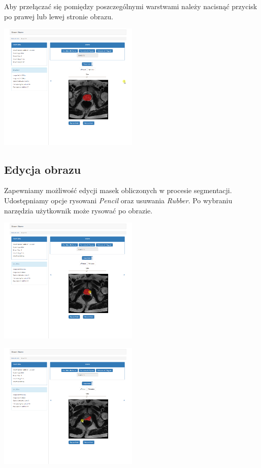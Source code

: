 \documentclass[a4paper,11pt,twoside]{report}
\theoremstyle{definition}
\begin{document}
Aby przełączać się pomiędzy poszczególnymi warstwami należy nacisnąć przycisk po prawej lub lewej stronie obrazu.

\begin{minipage}{\linewidth}
	\centering
	\includegraphics[width=0.5\textwidth]{FrontScreen/Editing/15.png}
\end{minipage}

\subsection{Edycja obrazu}

Zapewniamy możliwość edycji masek obliczonych w procesie segmentacji. Udostępniamy opcje rysowani \textit{Pencil} oraz usuwania \textit{Rubber}. Po wybraniu narzędzia użytkownik może rysować po obrazie.

\begin{minipage}{\linewidth}
	\centering
	\includegraphics[width=0.5\textwidth]{FrontScreen/Editing/117.png}
\end{minipage}
\begin{minipage}{\linewidth}
	\centering
	\includegraphics[width=0.5\textwidth]{FrontScreen/Editing/236.png}
\end{minipage}
\end{document}
